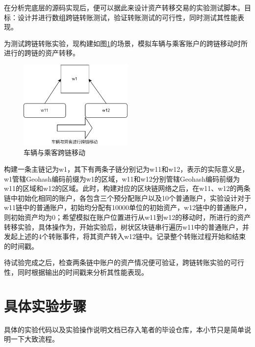 在分析完底层的源码实现后，便可以据此来设计资产转移交易的实验测试脚本。目标：设计并进行数组跨链转账测试，验证转账测试的可行性，同时测试其性能表现。

为测试跨链转账实验，现构建如图\ref{fig:车辆与乘客跨链移动}的场景，模拟车辆与乘客账户的跨链移动时所进行的跨链的资产转移。

\begin{figure}
	\centering
	\includegraphics[width=0.5\textwidth]{figures/车辆与乘客跨链移动.png}
	\caption{车辆与乘客跨链移动}
	\label{fig:车辆与乘客跨链移动}
\end{figure}

构建一条主链记为w1，其下有两条子链分别记为w11和w12，表示的实际意义是，w1管辖Geohash编码前缀为w1的区域，w11和w12分别管辖Geohash编码前缀为w11的区域和w12的区域。此时，构建对应的区块链网络之后，在w11、w12的两条链中初始化相同的账户，各包含三个预分配账户以及10个普通账户，实验设计对于w11链中的普通账户，初始均分配有10000单位的初始资产，w12链中的普通账户，则初始资产均为0；希望模拟在账户位置进行从w11到w12的移动时，所进行的资产转移实验，具体操作为，开始实验后，树状区块链串行遍历w11中的普通账户，并发起上述的4个转账事件，将其资产转入w12链中。记录整个转账过程开始和结束的时间戳。

待试验完成之后，检查两条链中账户的资产情况便可验证，跨链转账实验的可行性，同时根据输出的时间戳来分析其性能表现。

\section{具体实验步骤}

具体的实验代码以及实验操作说明文档已存入笔者的毕设仓库，本小节只是简单说明一下大致流程。

